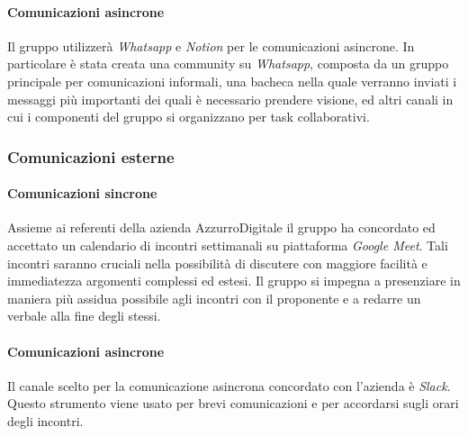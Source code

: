 \documentclass[10pt, a4paper]{article}
\begin{document}
\paragraph{Comunicazioni asincrone}Il gruppo utilizzerà \textit{Whatsapp} e \textit{Notion} per le comunicazioni asincrone. In particolare è stata creata una community su \textit{Whatsapp}, composta da un gruppo principale per comunicazioni informali, una bacheca nella quale verranno inviati i messaggi più importanti dei quali è necessario prendere visione, ed altri canali in cui i componenti del gruppo si organizzano per task collaborativi.

\subsubsection{Comunicazioni esterne}
\paragraph{Comunicazioni sincrone} Assieme ai referenti della azienda AzzurroDigitale il gruppo ha concordato ed accettato un calendario di incontri settimanali su piattaforma \textit{Google Meet}. Tali incontri saranno cruciali nella possibilità di discutere con maggiore facilità e immediatezza argomenti complessi ed estesi. Il gruppo si impegna a presenziare in maniera più assidua possibile agli incontri con il proponente e a redarre un verbale alla fine degli stessi.

\paragraph{Comunicazioni asincrone} Il canale scelto per la comunicazione asincrona concordato con l'azienda è \textit{Slack}. Questo strumento viene usato per brevi comunicazioni e per accordarsi sugli orari degli incontri.
\end{document}

